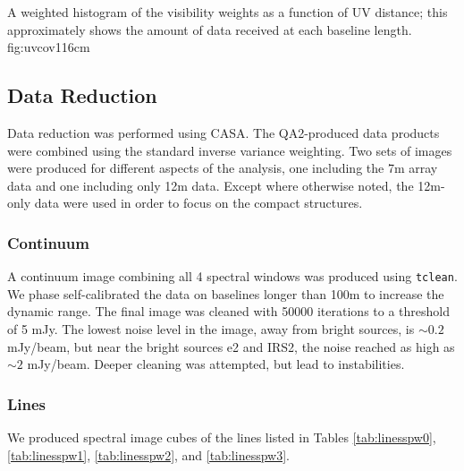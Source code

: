 \documentclass{aa}
\begin{document}
{A weighted histogram of the visibility weights as a function of UV distance;
this approximately shows the amount of data received at each baseline length.}
{fig:uvcov}{1}{16cm}



\subsection{Data Reduction}
Data reduction was performed using CASA.  The QA2-produced data products were
combined using the standard inverse variance weighting.  Two sets of images
were produced for different aspects of the analysis, one including the 7m array
data and one including only 12m data.  Except where otherwise noted, the
12m-only data were used in order to focus on the compact structures.


\subsubsection{Continuum}
A continuum image combining all 4 spectral windows was produced using
\texttt{tclean}.  We phase self-calibrated the data on baselines longer than
100m to increase the dynamic range.  The final image was cleaned with 50000
iterations to a threshold of 5 mJy.  The lowest noise level in the image, away
from bright sources, is $\sim0.2$ mJy/beam, but near the bright sources e2 and
IRS2, the noise reached as high as $\sim2$ mJy/beam.  Deeper cleaning was
attempted, but lead to instabilities.


\subsubsection{Lines}
We produced spectral image cubes of the lines listed in Tables
\ref{tab:linesspw0},
\ref{tab:linesspw1},
\ref{tab:linesspw2}, and
\ref{tab:linesspw3}.








\end{document}
